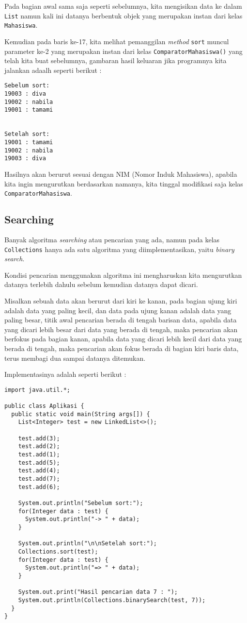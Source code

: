 Pada bagian awal sama saja seperti sebelumnya, kita mengisikan data ke dalam \texttt{List} namun kali ini datanya berbentuk objek yang merupakan instan dari kelas \texttt{Mahasiswa}. 

Kemudian pada baris ke-17, kita melihat pemanggilan \textit{method} \texttt{sort} muncul parameter ke-2 yang merupakan instan dari kelas \texttt{ComparatorMahasiswa()} yang telah kita buat sebelumnya, gambaran hasil keluaran jika programnya kita jalankan adaalh seperti berikut :

\begin{lstlisting}
Sebelum sort:
19003 : diva
19002 : nabila
19001 : tamami


Setelah sort:
19001 : tamami
19002 : nabila
19003 : diva
\end{lstlisting}

Hasilnya akan berurut sesuai dengan NIM (Nomor Induk Mahasiswa), apabila kita ingin mengurutkan berdasarkan namanya, kita tinggal modifikasi saja kelas \texttt{ComparatorMahasiswa}.

\subsection{Searching}

Banyak algoritma \textit{searching} atau pencarian yang ada, namun pada kelas \texttt{Collections} hanya ada satu algoritma yang diimplementasikan, yaitu \textit{binary search}.

Kondisi pencarian menggunakan algoritma ini mengharuskan kita mengurutkan datanya terlebih dahulu sebelum kemudian datanya dapat dicari. 

Misalkan sebuah data akan berurut dari kiri ke kanan, pada bagian ujung kiri adalah data yang paling kecil, dan data pada ujung kanan adalah data yang paling besar, titik awal pencarian berada di tengah barisan data, apabila data yang dicari lebih besar dari data yang berada di tengah, maka pencarian akan berfokus pada bagian kanan, apabila data yang dicari lebih kecil dari data yang berada di tengah, maka pencarian akan fokus berada di bagian kiri baris data, terus membagi dua sampai datanya ditemukan.

Implementasinya adalah seperti berikut :

\begin{lstlisting}
import java.util.*;

public class Aplikasi {
  public static void main(String args[]) {
    List<Integer> test = new LinkedList<>();

    test.add(3);
    test.add(2);
    test.add(1);
    test.add(5);
    test.add(4);
    test.add(7);
    test.add(6);

    System.out.println("Sebelum sort:");
    for(Integer data : test) {
      System.out.println("-> " + data);
    }

    System.out.println("\n\nSetelah sort:");
    Collections.sort(test);
    for(Integer data : test) {
      System.out.println("=> " + data);
    }

    System.out.print("Hasil pencarian data 7 : ");
    System.out.println(Collections.binarySearch(test, 7));
  }
}
\end{lstlisting}

